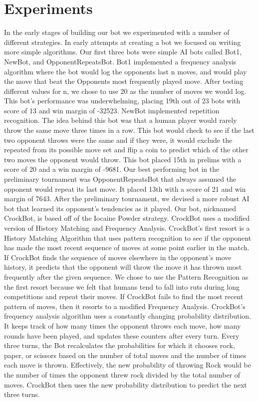 
\section{Experiments}
\label{sec:expts}

	In the early stages of building our bot we experimented with a number of different strategies. In early attempts at creating a bot we focused on writing more simple algorithms. Our first three bots were simple AI bots called Bot1, NewBot, and OpponentRepeatsBot. Bot1 implemented a frequency analysis algorithm where the bot would log the opponents last n moves, and would play the move that beat the Opponents most frequently played move. After testing different values for n, we chose to use 20 as the number of moves we would log. This bot's performance was underwhelming, placing 19th out of 23 bots with score of 13 and win margin of -32523. NewBot implemented repetition recognition. The idea behind this bot was that a human player would rarely throw the same move three times in a row. This bot would check to see if the last two opponent throws were the same and if they were, it would exclude the repeated from its possible move set and flip a coin to predict which of the other two moves the opponent would throw. This bot placed 15th in prelims with a score of 20 and a win margin of -9681. Our best performing bot in the preliminary tournament was OpponentRepeatsBot that always assumed the opponent would repeat its last move. It placed 13th with a score of 21 and win margin of 7643.
	After the preliminary tournament, we devised a more robust AI bot that learned its opponent's tendencies as it played. Our bot, nicknamed CrockBot, is based off of the Iocaine Powder strategy.  CrockBot uses a modified version of History Matching and Frequency Analysis. CrockBot's first resort is a History Matching Algorithm that uses pattern recognition to see if the opponent has made the most recent sequence of moves at some point earlier in the match. If CrockBot finds the sequence of moves elsewhere in the opponent's move history, it predicts that the opponent will throw the move it has thrown most frequently after the given sequence.  We chose to use the Pattern Recognition as the first resort because we felt that humans tend to fall into ruts during long competitions and repeat their moves. If CrockBot fails to find the most recent pattern of moves, then it resorts to a modified Frequency Analysis. CrockBot's frequency analysis algorithm uses a constantly changing probability distribution. It keeps track of how many times the opponent throws each move, how many rounds have been played, and updates these counters after every turn. Every three turns, the Bot recalculates the probabilities for which it chooses rock, paper, or scissors based on the number of total moves and the number of times each move is thrown. Effectively, the  new probability of throwing Rock would be the number of times the opponent threw rock divided by the total number of moves. CrockBot then uses the new probability distribution to predict the next three turns. 
